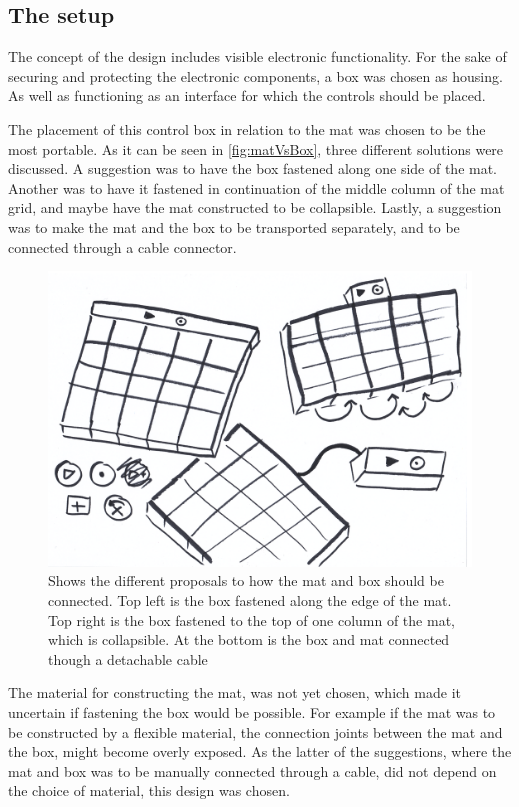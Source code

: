 \subsection{The setup}
The concept of the design includes visible electronic functionality. For the sake of securing and protecting the electronic components, a box was chosen as housing. As well as functioning as an interface for which the controls should be placed.

The placement of this control box in relation to the mat was chosen to be the most portable. As it can be seen in \autoref{fig:matVsBox}, three different solutions were discussed. A suggestion was to have the box fastened along one side of the mat. Another was to have it fastened in continuation of the middle column of the mat grid, and maybe have the mat constructed to be collapsible. Lastly, a suggestion was to make the mat and the box to be transported separately, and to be connected through a cable connector.     

\begin{figure}[H]
	\centering
	\includegraphics[width=0.7\linewidth]{figure/Design/maatteSetup}
	\caption{Shows the different proposals to how the mat and box should be connected. Top left is the box fastened along the edge of the mat. Top right is the box fastened to the top of one column of the mat, which is collapsible. At the bottom is the box and mat connected though a detachable cable}
	\label{fig:matVsBox}
\end{figure} 

The material for constructing the mat, was not yet chosen, which made it uncertain if fastening the box would be possible. For example if the mat was to be constructed by a flexible material, the connection joints between the mat and the box, might become overly exposed.
As the latter of the suggestions, where the mat and box was to be manually connected through a cable, did not depend on the choice of material, this design was chosen. 

